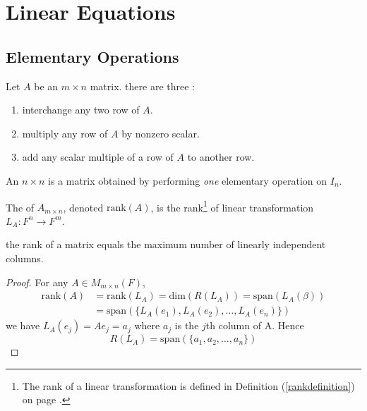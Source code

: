 \section{Linear Equations}

\subsection{Elementary Operations}

\begin{definition}
	Let $A$ be an $m\times n$ matrix. there are three :
	\begin{enumerate}
		\item interchange any two row of $A$.
		\item multiply any row of $A$ by nonzero scalar.
		\item add any scalar multiple of a row of $A$ to another row.
	\end{enumerate}
\end{definition}

\begin{definition}
	An $n\times n$  is a matrix obtained by performing \emph{one} elementary operation on $I_n$.
\end{definition}

\begin{definition}
	The  of $A_{m \times n}$, denoted $\text{rank}(A)$, is the rank\footnote{The rank of a linear transformation is defined in Definition (\ref{rankdefinition}) on page \pageref{rankdefinition}.} of linear transformation $L_A: F^n \rightarrow F^m$.
\end{definition}

\begin{theorem}
	the rank of a matrix equals the maximum number of linearly independent columns.
\end{theorem}
\begin{proof}
	For any $A \in M_{m\times n}(F)$, 
	\begin{equation*}
		\begin{aligned}
			\text{rank}(A) &= \text{rank}(L_A) = \text{dim}(R(L_A)) = \text{span}(L_A(\beta)) \\
			&= \text{span}(\{ L_A(e_1), L_A(e_2), \dots, L_A(e_n) \})
		\end{aligned}
	\end{equation*}
	we have $L_A(e_j) = A e_j = a_j$ where $a_j$ is the $j$th column of A. Hence
	\begin{equation*}
		R(L_A) = \text{span}(\{ a_1, a_2, \dots, a_n \})
	\end{equation*}
\end{proof}

